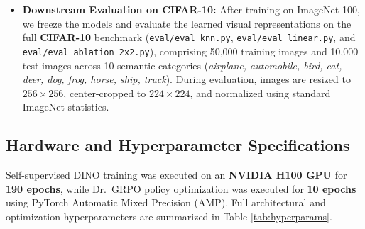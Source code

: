 \documentclass[11pt,a4paper]{article}
\begin{document}
\begin{itemize}[leftmargin=*]
    \item \textbf{Downstream Evaluation on CIFAR-10:} After training on ImageNet-100, we freeze the models and evaluate the learned visual representations on the full \textbf{CIFAR-10} benchmark \cite{krizhevsky2009cifar} (\texttt{eval/eval\_knn.py}, \texttt{eval/eval\_linear.py}, and \texttt{eval/eval\_ablation\_2x2.py}), comprising 50,000 training images and 10,000 test images across 10 semantic categories (\textit{airplane, automobile, bird, cat, deer, dog, frog, horse, ship, truck}). During evaluation, images are resized to $256 \times 256$, center-cropped to $224 \times 224$, and normalized using standard ImageNet statistics.
\end{itemize}

\subsection{Hardware and Hyperparameter Specifications}
Self-supervised DINO training was executed on an \textbf{NVIDIA H100 GPU} for \textbf{190 epochs}, while Dr.\ GRPO policy optimization was executed for \textbf{10 epochs} using PyTorch Automatic Mixed Precision (AMP). Full architectural and optimization hyperparameters are summarized in Table \ref{tab:hyperparams}.
\end{document}
